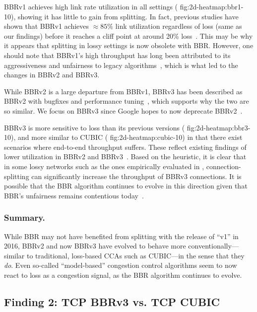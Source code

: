 BBRv1 achieves high link rate utilization in all settings (\Cref
{fig:2d-heatmap:bbr1-10}), showing it has little to gain from splitting.
In fact, previous studies have shown that BBRv1 achieves $\approx\!85\%$
link utilization regardless of loss (same as our findings) before it reaches
a cliff point at around 20\% loss~\cite{cao2019use,cardwell2017bbr}.
This may be why it appears that splitting in lossy settings is now obsolete with BBR.
However, one should note that BBRv1's high throughput has long been attributed
to its aggressiveness and unfairness to legacy algorithms~\cite
{ware2019modeling,cao2019use}, which is what led to the changes in BBRv2 and
BBRv3.

While BBRv2 is a large departure from BBRv1, BBRv3 has been described as BBRv2
with bugfixes and performance tuning~\cite{cardwell2024bbrv3-ietf119}, which
supports why the two are so similar. We focus on BBRv3 since Google hopes to
now deprecate BBRv2~\cite{cardwell2024bbrv3-ietf119}.

BBRv3 is more sensitive to loss than its previous versions (\Cref
{fig:2d-heatmap:bbr3-10}), and more similar to CUBIC (\Cref
{fig:2d-heatmap:cubic-10}) in that there exist scenarios where end-to-end
throughput suffers.
These reflect existing findings of lower utilization in BBRv2 and BBRv3~\cite
{datta2023replication,song2021understanding,zeynali2024promises}.
Based on the heuristic, it is clear that in some lossy networks
such as the ones empirically evaluated in ,
connection-splitting
can significantly increase the throughput of BBRv3 connections.
It is possible that the BBR algorithm continues to evolve in this direction
given that BBR's unfairness remains contentious today~\cite
{datta2023replication,zeynali2024promises}.

\subsubsection{Summary.}

While BBR may not have benefited from splitting with the release of ``v1'' in 2016, BBRv2 and
now BBRv3 have evolved to behave more conventionally---similar to traditional,
loss-based CCAs such as CUBIC---in the sense that they \textit{do}. Even
so-called ``model-based'' congestion control algorithms seem to now react to
loss as a congestion signal, as the BBR algorithm continues to evolve.

\subsection{Finding 2: TCP BBRv3 vs. TCP CUBIC}
\label{sec:splitting:results:finding2}

